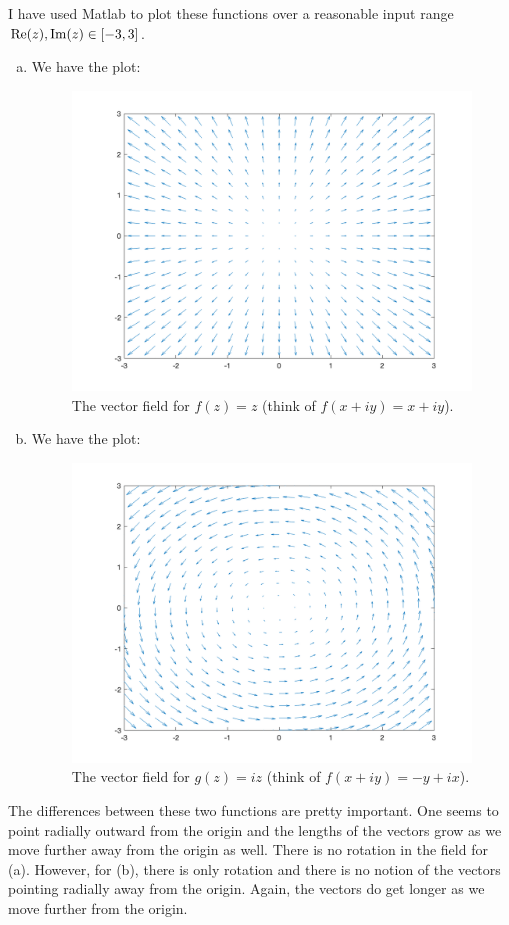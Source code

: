 \documentclass[12pt]{article} %
\begin{document}
\begin{solution}
	I have used Matlab to plot these functions over a reasonable input range $\mathrm{Re}(z),\mathrm{Im}(z) \in [-3,3]$.
		\begin{enumerate}[(a)]
			\item We have the plot:
			\begin{figure}[H]
				\centering
				\includegraphics[width=\textwidth]{div_field.png}
				\caption{The vector field for $f(z)=z$ (think of $f(x+iy)=x+iy$).}
			\end{figure}
			\item We have the plot:
						\begin{figure}[H]
							\centering
							\includegraphics[width=\textwidth]{rot_field.png}
							\caption{The vector field for $g(z)=iz$ (think of $f(x+iy)=-y+ix$).}
						\end{figure}
			\end{enumerate}
		The differences between these two functions are pretty important. One seems to point radially outward from the origin and the lengths of the vectors grow as we move further away from the origin as well. There is no rotation in the field for (a). However, for (b), there is only rotation and there is no notion of the vectors pointing radially away from the origin. Again, the vectors do get longer as we move further from the origin.
		

\end{solution}
\end{document}
